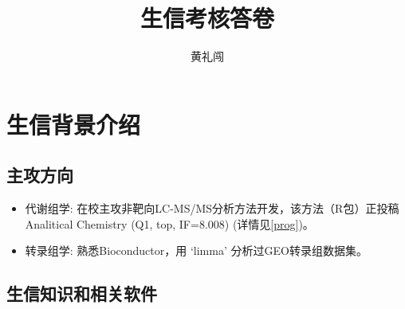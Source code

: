 \documentclass[
]{article}
\title{生信考核答卷}
\author{黄礼闯}
\date{}
\providecommand{\tightlist}{%
  \setlength{\itemsep}{0pt}\setlength{\parskip}{0pt}}
\begin{document}
\maketitle

{
\setcounter{tocdepth}{3}
\tableofcontents
}
\hypertarget{ux751fux4fe1ux80ccux666fux4ecbux7ecd}{%
\section{生信背景介绍}\label{ux751fux4fe1ux80ccux666fux4ecbux7ecd}}

\hypertarget{ux4e3bux653bux65b9ux5411}{%
\subsection{主攻方向}\label{ux4e3bux653bux65b9ux5411}}

\begin{itemize}
\tightlist
\item
  代谢组学: 在校主攻非靶向LC-MS/MS分析方法开发，该方法（R包）正投稿Analitical
  Chemistry (Q1, top, IF=8.008) (详情见\ref{prog})。
\item
  转录组学: 熟悉Bioconductor，用 `limma' 分析过GEO转录组数据集。
\end{itemize}

\hypertarget{ux751fux4fe1ux77e5ux8bc6ux548cux76f8ux5173ux8f6fux4ef6}{%
\subsection{生信知识和相关软件}\label{ux751fux4fe1ux77e5ux8bc6ux548cux76f8ux5173ux8f6fux4ef6}}
\end{document}
